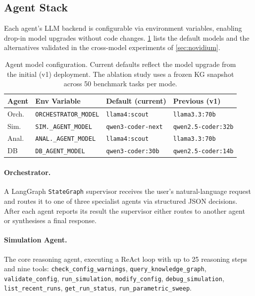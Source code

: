 \documentclass[preprint,review,12pt]{elsarticle}
\begin{document}
\subsection{Agent Stack}

Each agent's LLM backend is configurable via environment variables,
enabling drop-in model upgrades without code changes.
\cref{tab:agent-models} lists the default models and the alternatives
validated in the cross-model experiments of \cref{sec:novidium}.

\begin{table}[h]
\centering\scriptsize
\caption{Agent model configuration.  Current defaults reflect the
  model upgrade from the initial (v1) deployment.  The ablation study uses a frozen KG snapshot
  across 50 benchmark tasks per mode.}
\label{tab:agent-models}
\setlength{\tabcolsep}{2.5pt}
\begin{tabular}{@{}llll@{}}
\toprule
Agent & Env Variable & Default (current) & Previous (v1) \\
\midrule
Orch.  & \texttt{ORCHESTRATOR\_MODEL} & \texttt{llama4:scout} & \texttt{llama3.3:70b} \\
Sim.   & \texttt{SIM.\_AGENT\_MODEL} & \texttt{qwen3-coder-next} & \texttt{qwen2.5-coder:32b} \\
Anal.  & \texttt{ANAL.\_AGENT\_MODEL} & \texttt{llama4:scout} & \texttt{llama3.3:70b} \\
DB     & \texttt{DB\_AGENT\_MODEL} & \texttt{qwen3-coder:30b} & \texttt{qwen2.5-coder:14b} \\
\bottomrule
\end{tabular}
\end{table}

\paragraph{Orchestrator.}
A LangGraph \texttt{StateGraph} supervisor receives the user's
natural-language request and routes it to one of three specialist agents via
structured JSON decisions.  After each agent reports its result the
supervisor either routes to another agent or synthesises a final response.

\paragraph{Simulation Agent.}
The core reasoning agent, executing a ReAct loop \citep{yao2023react}
with up to 25 reasoning steps and nine tools:
\texttt{check\_config\_warnings},
\texttt{query\_knowledge\_graph},
\texttt{validate\_config},
\texttt{run\_simulation},
\texttt{modify\_config},
\texttt{debug\_simulation},
\texttt{list\_recent\_runs},
\texttt{get\_run\_status},
\texttt{run\_parametric\_sweep}.
\end{document}
